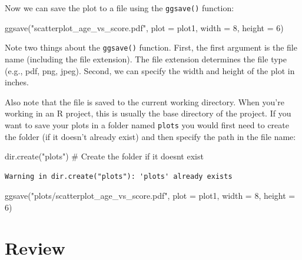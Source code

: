 \documentclass[
  letterpaper,
  8pt,
  a4paper]{book}
\newenvironment{Shaded}{\begin{snugshade}}{\end{snugshade}}
\newcommand{\AttributeTok}[1]{\textcolor[rgb]{0.40,0.45,0.13}{#1}}
\newcommand{\CommentTok}[1]{\textcolor[rgb]{0.37,0.37,0.37}{#1}}
\newcommand{\DecValTok}[1]{\textcolor[rgb]{0.68,0.00,0.00}{#1}}
\newcommand{\FunctionTok}[1]{\textcolor[rgb]{0.28,0.35,0.67}{#1}}
\newcommand{\NormalTok}[1]{\textcolor[rgb]{0.00,0.23,0.31}{#1}}
\newcommand{\StringTok}[1]{\textcolor[rgb]{0.13,0.47,0.30}{#1}}
\begin{document}
Now we can save the plot to a file using the \texttt{ggsave()} function:

\begin{Shaded}
\begin{Highlighting}[]
\FunctionTok{ggsave}\NormalTok{(}\StringTok{"scatterplot\_age\_vs\_score.pdf"}\NormalTok{, }\AttributeTok{plot =}\NormalTok{ plot1, }\AttributeTok{width =} \DecValTok{8}\NormalTok{, }\AttributeTok{height =} \DecValTok{6}\NormalTok{)}
\end{Highlighting}
\end{Shaded}

Note two things about the \texttt{ggsave()} function. First, the first
argument is the file name (including the file extension). The file
extension determines the file type (e.g., pdf, png, jpeg). Second, we
can specify the width and height of the plot in inches.

Also note that the file is saved to the current working directory. When
you're working in an R project, this is usually the base directory of
the project. If you want to save your plots in a folder named
\texttt{plots} you would first need to create the folder (if it doesn't
already exist) and then specify the path in the file name:

\begin{Shaded}
\begin{Highlighting}[]
\FunctionTok{dir.create}\NormalTok{(}\StringTok{"plots"}\NormalTok{)  }\CommentTok{\# Create the folder if it doesn\textquotesingle{}t exist}
\end{Highlighting}
\end{Shaded}

\begin{verbatim}
Warning in dir.create("plots"): 'plots' already exists
\end{verbatim}

\begin{Shaded}
\begin{Highlighting}[]
\FunctionTok{ggsave}\NormalTok{(}\StringTok{"plots/scatterplot\_age\_vs\_score.pdf"}\NormalTok{, }\AttributeTok{plot =}\NormalTok{ plot1, }\AttributeTok{width =} \DecValTok{8}\NormalTok{, }\AttributeTok{height =} \DecValTok{6}\NormalTok{)}
\end{Highlighting}
\end{Shaded}

\section*{Review}\label{review}
\end{document}
